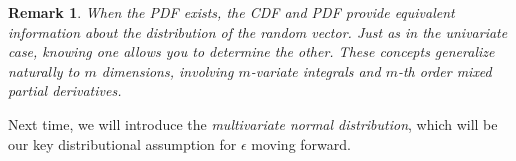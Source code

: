 \documentclass[11pt]{article}
\theoremstyle{mytheoremstyle}
\theoremstyle{mydefinitionstyle}
\newtheorem{remark}[theorem]{Remark}
\begin{document}
\begin{remark}
When the PDF exists, the CDF and PDF provide equivalent information about the distribution of the random vector. Just as in the univariate case, knowing one allows you to determine the other. These concepts generalize naturally to $m$ dimensions, involving $m$-variate integrals and $m$-th order mixed partial derivatives.
\end{remark}

Next time, we will introduce the \textit{multivariate normal distribution}, which will be our key distributional assumption for $\epsilon$ moving forward.
\end{document}
